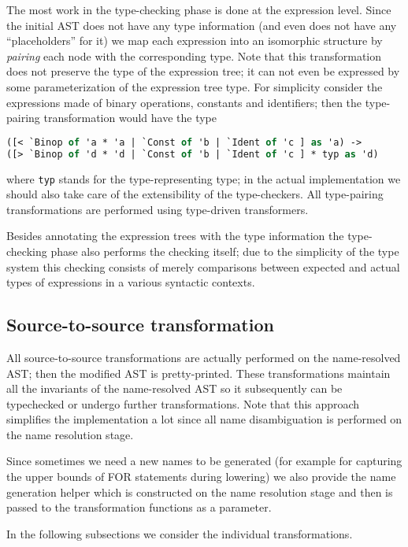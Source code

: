 The most work in the type-checking phase is done at the expression level. Since the 
initial AST does not have any type information (and even does not have any ``placeholders'' 
for it) we map each expression into an isomorphic structure by \emph{pairing} each node 
with the corresponding type. Note that this transformation does not preserve the type of
the expression tree; it can not even be expressed by some parameterization of the
expression tree type. For simplicity consider the expressions made of binary operations,
constants and identifiers; then the type-pairing transformation would have the type

\begin{lstlisting}[language=ocaml]
([< `Binop of 'a * 'a | `Const of 'b | `Ident of 'c ] as 'a) ->
([> `Binop of 'd * 'd | `Const of 'b | `Ident of 'c ] * typ as 'd)
\end{lstlisting}

where \lstinline{typ} stands for the type-representing type; in the actual implementation
we should also take care of the extensibility of the type-checkers. All type-pairing
transformations are performed using type-driven transformers.

Besides annotating the expression trees with the type information the type-checking 
phase also performs the checking itself; due to the simplicity of the type system
this checking consists of merely comparisons between expected and actual types of expressions
in a various syntactic contexts.

\subsection{Source-to-source transformation}

All source-to-source transformations are actually performed on the name-resolved AST; then
the modified AST is pretty-printed. These transformations maintain all the invariants of
the name-resolved AST so it subsequently can be typechecked or undergo further 
transformations. Note that this approach simplifies the implementation a lot since all name 
disambiguation is performed on the name resolution stage.

Since sometimes we need a new names to be generated (for example for capturing the upper bounds of
FOR statements during lowering) we also provide the name generation helper which is constructed
on the name resolution stage and then is passed to the transformation functions as a parameter.

In the following subsections we consider the individual transformations.

